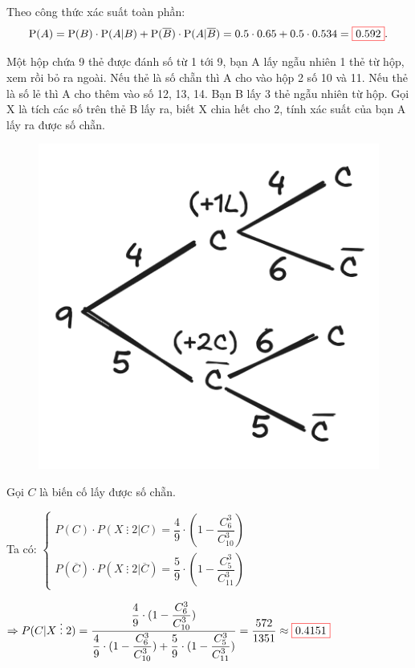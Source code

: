 \documentclass[twoside,final]{hcmut-report}
\newcommand{\exercise}[1]{\begin{exercisebox}#1\end{exercisebox}}
\newcommand{\result}[1]{\fcolorbox{red}{white}{#1}}
\newcommand{\divides}{\mathrel{\vdots}}
\begin{document}
Theo công thức xác suất toàn phần:
\[
    \mathrm{P}(A) = \mathrm{P}(B) \cdot \mathrm{P}(A | B) + \mathrm{P}(\overline{B}) \cdot \mathrm{P}(A | \overline{B})
    = 0.5 \cdot 0.65 + 0.5 \cdot 0.534 = \result{0.592}.
\]
\exercise{Một hộp chứa 9 thẻ được đánh số từ 1 tới 9, bạn A lấy ngẫu nhiên 1 thẻ từ hộp, xem rồi bỏ ra ngoài. Nếu thẻ là số chẵn thì A cho vào hộp 2 số 10 và 11. Nếu thẻ là số lẻ thì A cho thêm vào số 12, 13, 14. Bạn B lấy 3 thẻ ngẫu nhiên từ hộp. Gọi X là tích các số trên thẻ B lấy ra, biết X chia hết cho 2, tính xác suất của bạn A lấy ra được số chẵn.
}
\begin{figure}
    \centering
    \includegraphics[width=1.2\linewidth]{images/XSTK/2.png}
\end{figure}
Gọi $C$ là biến cố lấy được số chẵn.\par
Ta có:
$\begin{cases}
        P(C)\cdot P(X\divides 2|C) = \dfrac{4}{9}\cdot(1-\dfrac{C_6^3}{\displaystyle C_{10}^3}) \\
        P(\overline{C})\cdot P(X\divides 2|\overline{C}) = \dfrac{5}{9}\cdot(1-\dfrac{C_5^3}{\displaystyle C_{11}^3})
    \end{cases}$\par
$\Rightarrow P(C|X\divides 2) = \dfrac{\dfrac{4}{9}\cdot(1-\dfrac{C_6^3}{\displaystyle C_{10}^3})}{\dfrac{4}{9}\cdot(1-\dfrac{C_6^3}{\displaystyle C_{10}^3}) + \dfrac{5}{9}\cdot(1-\dfrac{C_5^3}{\displaystyle C_{11}^3})} =\dfrac{572}{1351}\approx \result{0.4151}$
\end{document}
